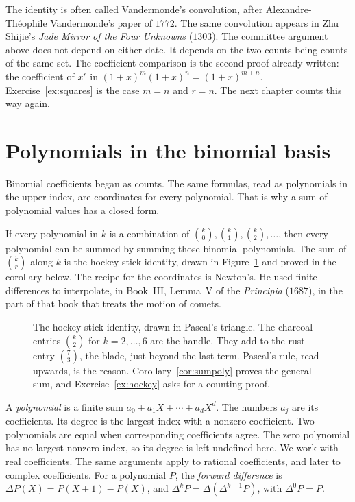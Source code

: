 The identity is often called Vandermonde's convolution, after Alexandre-Th\'eophile Vandermonde's paper of $1772$. The same convolution appears in Zhu Shijie's \emph{Jade Mirror of the Four Unknowns} ($1303$). The committee argument above does not depend on either date. It depends on the two counts being counts of the same set. The coefficient comparison is the second proof already written: the coefficient of $x^r$ in $(1+x)^m(1+x)^n=(1+x)^{m+n}$. Exercise~\ref{ex:squares} is the case $m=n$ and $r=n$. The next chapter counts this way again.

\section{Polynomials in the binomial basis}\label{sec:basis}

Binomial coefficients began as counts. The same formulas, read as polynomials in the upper index, are coordinates for every polynomial. That is why a sum of polynomial values has a closed form.

If every polynomial in $k$ is a combination of $\binom k0,\binom k1,\binom k2,\dots$, then every polynomial can be summed by summing those binomial polynomials. The sum of $\binom kr$ along $k$ is the hockey-stick identity, drawn in Figure~\ref{fig:hockey} and proved in the corollary below. The recipe for the coordinates is Newton's. He used finite differences to interpolate, in Book~III, Lemma~V of the \emph{Principia} ($1687$), in the part of that book that treats the motion of comets.

\begin{figure}[ht]
\centering
{}
\caption{The hockey-stick identity, drawn in Pascal's triangle. The charcoal entries $\binom k2$ for $k=2,\dots,6$ are the handle. They add to the rust entry $\binom73$, the blade, just beyond the last term. Pascal's rule, read upwards, is the reason. Corollary~\ref{cor:sumpoly} proves the general sum, and Exercise~\ref{ex:hockey} asks for a counting proof.}
\label{fig:hockey}
\end{figure}

A \emph{polynomial} is a finite sum $a_0+a_1X+\cdots+a_dX^d$. The numbers $a_j$ are its coefficients. Its degree is the largest index with a nonzero coefficient. Two polynomials are equal when corresponding coefficients agree. The zero polynomial has no largest nonzero index, so its degree is left undefined here. We work with real coefficients. The same arguments apply to rational coefficients, and later to complex coefficients. For a polynomial $P$, the \emph{forward difference} is $\Delta P(X)=P(X+1)-P(X)$, and $\Delta^kP=\Delta(\Delta^{k-1}P)$, with $\Delta^0P=P$.

